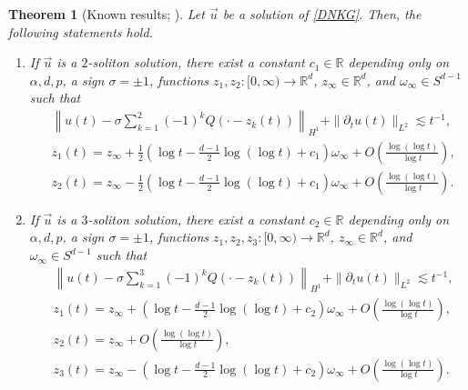 \documentclass[reqno]{amsart}
\theoremstyle{plain}
\newtheorem{theorem}{Theorem}[section]
\theoremstyle{definition}
\numberwithin{equation}{section}
\begin{document}
\begin{theorem}[Known results; \cite{CD,CMYZ,I2,I3}]\label{previoustheorem}
Let $\vec{u}$ be a solution of \eqref{DNKG}. Then, the following statements hold.
\begin{enumerate}
\item If $\vec{u}$ is a $2$-soliton solution, there exist a constant $c_1\in \mathbb{R}$ depending only on $\alpha,d,p$, a sign $\sigma=\pm 1$, functions $z_1,z_2:[0,\infty)\to\mathbb{R}^d$, $z_{\infty}\in \mathbb{R}^d$, and $\omega_{\infty}\in S^{d-1}$ such that
\begin{align*}
&\left\| u(t)-\sigma \sum_{k=1}^2 (-1)^kQ(\cdot-z_k(t))\right\|_{H^1}+\|{\partial}_tu(t)\|_{L^2}\lesssim t^{-1},
\\
&z_1(t)=z_{\infty}+\frac{1}{2}\left(\log{t}-\frac{d-1}{2}\log{(\log{t})}+c_1\right)\omega_{\infty}+O\left(\frac{\log{(\log{t})}}{\log{t}}\right),
\\
&z_2(t)=z_{\infty}-\frac{1}{2}\left(\log{t}-\frac{d-1}{2}\log{(\log{t})}+c_1\right)\omega_{\infty}+O\left(\frac{\log{(\log{t})}}{\log{t}}\right).
\end{align*}

\item If $\vec{u}$ is a $3$-soliton solution, there exist a constant $c_2\in \mathbb{R}$ depending only on $\alpha,d,p$, a sign $\sigma=\pm 1$, functions $z_1,z_2,z_3:[0,\infty)\to\mathbb{R}^d$, $z_{\infty}\in \mathbb{R}^d$, and $\omega_{\infty}\in S^{d-1}$ such that
\begin{align*}
&\left\| u(t)-\sigma \sum_{k=1}^3 (-1)^kQ(\cdot-z_k(t))\right\|_{H^1}+\|{\partial}_tu(t)\|_{L^2}\lesssim t^{-1},
\\
&z_1(t)=z_{\infty}+\left(\log{t}-\frac{d-1}{2}\log{(\log{t})}+c_2\right)\omega_{\infty}+O\left(\frac{\log{(\log{t})}}{\log{t}}\right),
\\
&z_2(t)=z_{\infty}+O\left(\frac{\log{(\log{t})}}{\log{t}}\right),
\\
&z_3(t)=z_{\infty}-\left(\log{t}-\frac{d-1}{2}\log{(\log{t})}+c_2\right)\omega_{\infty}+O\left(\frac{\log{(\log{t})}}{\log{t}}\right).
\end{align*}


\end{enumerate}
\end{theorem}
\end{document}
